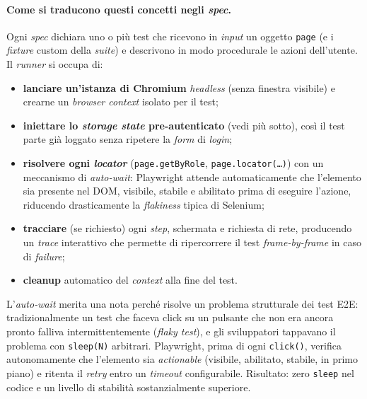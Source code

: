 \paragraph{Come si traducono questi concetti negli \emph{spec}.} Ogni \emph{spec} dichiara uno o più test che ricevono in \emph{input} un oggetto \texttt{page} (e i \emph{fixture} custom della \emph{suite}) e descrivono in modo procedurale le azioni dell'utente. Il \emph{runner} si occupa di:
\begin{itemize}
    \item \textbf{lanciare un'istanza di Chromium} \emph{headless} (senza finestra visibile) e crearne un \emph{browser context} isolato per il test;
    \item \textbf{iniettare lo \emph{storage state} pre-autenticato} (vedi più sotto), così il test parte già loggato senza ripetere la \emph{form} di \emph{login};
    \item \textbf{risolvere ogni \emph{locator}} (\texttt{page.getByRole}, \texttt{page.locator(\dots)}) con un meccanismo di \emph{auto-wait}: Playwright attende automaticamente che l'elemento sia presente nel DOM, visibile, stabile e abilitato prima di eseguire l'azione, riducendo drasticamente la \emph{flakiness} tipica di Selenium;
    \item \textbf{tracciare} (se richiesto) ogni \emph{step}, schermata e richiesta di rete, producendo un \emph{trace} interattivo che permette di ripercorrere il test \emph{frame-by-frame} in caso di \emph{failure};
    \item \textbf{cleanup} automatico del \emph{context} alla fine del test.
\end{itemize}

L'\emph{auto-wait} merita una nota perché risolve un problema strutturale dei test E2E: tradizionalmente un test che faceva click su un pulsante che non era ancora pronto falliva intermittentemente (\emph{flaky test}), e gli sviluppatori tappavano il problema con \texttt{sleep(N)} arbitrari. Playwright, prima di ogni \texttt{click()}, verifica autonomamente che l'elemento sia \emph{actionable} (visibile, abilitato, stabile, in primo piano) e ritenta il \emph{retry} entro un \emph{timeout} configurabile. Risultato: zero \texttt{sleep} nel codice e un livello di stabilità sostanzialmente superiore.

